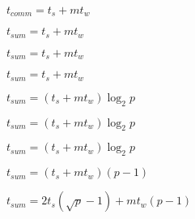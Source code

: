 \documentclass[10pt]{book}
\begin{document}
\begin{mdSnippets}
\begin{mdInlineSnippet}%
$t_{comm} = t_s + mt_w$\end{mdInlineSnippet}%
\begin{mdInlineSnippet}[10819d45a6f11b738122f5fb8de9b0d8]%
$t_{sum} = t_s + mt_w$\end{mdInlineSnippet}%
\begin{mdInlineSnippet}[10819d45a6f11b738122f5fb8de9b0d8]%
$t_{sum} = t_s + mt_w$\end{mdInlineSnippet}%
\begin{mdInlineSnippet}[10819d45a6f11b738122f5fb8de9b0d8]%
$t_{sum} = t_s + mt_w$\end{mdInlineSnippet}%
\begin{mdInlineSnippet}%
$t_{sum} = (t_s + mt_w) \log _2 p$\end{mdInlineSnippet}%
\begin{mdInlineSnippet}%
$t_{sum} = (t_s + mt_w) \log _2 p$\end{mdInlineSnippet}%
\begin{mdInlineSnippet}%
$t_{sum} = (t_s + mt_w) \log _2 p$\end{mdInlineSnippet}%
\begin{mdInlineSnippet}[76ecbdcc60db753d50e0f54442684a1f]%
$t_{sum} = (t_s + mt_w)(p - 1)$\end{mdInlineSnippet}%
\begin{mdInlineSnippet}[9f1e04740609c172e554c5544a2e4175]%
$t_{sum} = 2t_s(\sqrt {p} - 1) + mt_w(p  - 1)$\end{mdInlineSnippet}%
\begin{mdInlineSnippet}[3177ba3c8da42e1c97d69a8e7edb5f7a]%
$t_{sum} = t_s \log _2 {p + mt_w(p - 1)$\end{mdInlineSnippet}%

\end{mdSnippets}
\end{document}
